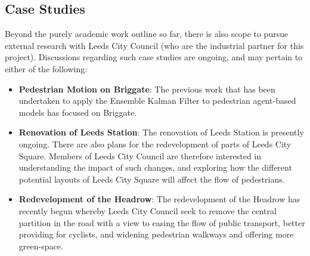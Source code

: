 


\subsection{Case Studies}\label{sub:structure:case_studies}

Beyond the purely academic work outline so far, there is also scope to pursue
external research with Leeds City Council (who are the industrial partner for
this project).
Discussions regarding such case studies are ongoing, and may pertain to either
of the following:
\begin{itemize}
    \item \textbf{Pedestrian Motion on Briggate}: The previous work that has
        been undertaken to apply the Ensemble Kalman Filter to pedestrian
        agent-based models has focused on Briggate. 
    \item \textbf{Renovation of Leeds Station}: The renovation of Leeds Station
        is presently ongoing. There are also plans for the redevelopment of
        parts of Leeds City Square. Members of Leeds City Council are therefore
        interested in understanding the impact of such changes, and exploring
        how the different potential layouts of Leeds City Square will affect the
        flow of pedestrians.
    \item \textbf{Redevelopment of the Headrow}: The redevelopment of the
        Headrow has recently begun whereby Leeds City Council seek to remove the
        central partition in the road with a view to easing the flow of public
        transport, better providing for cyclists, and widening pedestrian
        walkways and offering more green-space.
\end{itemize}

\newpage

